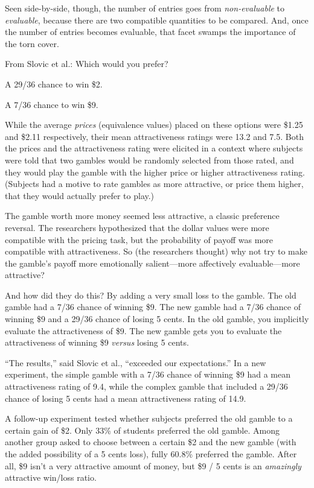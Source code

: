 {
 Seen side-by-side, though, the number of entries goes from
\textit{non-evaluable} to \textit{evaluable}, because there are two
compatible quantities to be compared. And, once the number of entries
becomes evaluable, that facet swamps the importance of the torn cover.}

{
 From Slovic et al.: Which would you prefer?}

{
 A 29/36 chance to win \$2.}

{
 A 7/36 chance to win \$9.}

{
 While the average \textit{prices} (equivalence values) placed on
these options were \$1.25 and \$2.11 respectively, their mean
attractiveness ratings were 13.2 and 7.5. Both the prices and the
attractiveness rating were elicited in a context where subjects were
told that two gambles would be randomly selected from those rated, and
they would play the gamble with the higher price or higher
attractiveness rating. (Subjects had a motive to rate gambles as more
attractive, or price them higher, that they would actually prefer to
play.)}

{
 The gamble worth more money seemed less attractive, a classic
preference reversal. The researchers hypothesized that the dollar
values were more compatible with the pricing task, but the probability
of payoff was more compatible with attractiveness. So (the researchers
thought) why not try to make the gamble's payoff more
emotionally salient---more affectively evaluable---more attractive?}

{
 And how did they do this? By adding a very small loss to the
gamble. The old gamble had a 7/36 chance of winning \$9. The new gamble
had a 7/36 chance of winning \$9 and a 29/36 chance of losing 5 cents.
In the old gamble, you implicitly evaluate the attractiveness of \$9.
The new gamble gets you to evaluate the attractiveness of winning \$9
\textit{versus} losing 5 cents.}

{
 ``The results,'' said Slovic et
al., ``exceeded our expectations.''
In a new experiment, the simple gamble with a 7/36 chance of winning
\$9 had a mean attractiveness rating of 9.4, while the complex gamble
that included a 29/36 chance of losing 5 cents had a mean
attractiveness rating of 14.9.}

{
 A follow-up experiment tested whether subjects preferred the old
gamble to a certain gain of \$2. Only 33\% of students preferred the
old gamble. Among another group asked to choose between a certain \$2
and the new gamble (with the added possibility of a 5 cents loss),
fully 60.8\% preferred the gamble. After all, \$9 isn't
a very attractive amount of money, but \$9 / 5 cents is an
\textit{amazingly} attractive win/loss ratio.}

